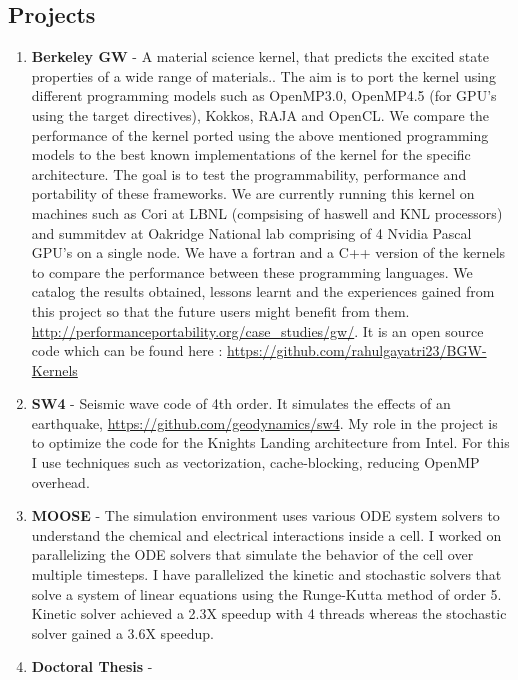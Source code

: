 \documentclass[margin]{res}
\begin{document}
\begin{resume}
\section{Projects}
\begin{enumerate}
%
        \item { \bf Berkeley GW} -
        A material science kernel, that predicts the excited state properties of a wide range of materials..
        The aim is to port the kernel using different programming models such as OpenMP3.0, OpenMP4.5 (for GPU's using the target directives), Kokkos, RAJA and OpenCL.
        We compare the performance of the kernel ported using the above mentioned programming models to the best known implementations of the kernel for the specific architecture.
        The goal is to test the programmability, performance and portability of these frameworks.
        We are currently running this kernel on machines such as Cori at LBNL (compsising of haswell and KNL processors) and summitdev at Oakridge National lab comprising of
        4 Nvidia Pascal GPU's on a single node.
        We have a fortran and a C++ version of the kernels to compare the performance between these programming languages.
        We catalog the results obtained, lessons learnt and the experiences gained from this project so that the future users might benefit from them.
        \url{http://performanceportability.org/case_studies/gw/}. It is an open source code which can be found here :
        \url{https://github.com/rahulgayatri23/BGW-Kernels}
%
    \item {\bf SW4} -
            Seismic wave code of 4th order.
            It simulates the effects of an earthquake, \url{https://github.com/geodynamics/sw4}.
            My role in the project is to optimize the code for the Knights Landing architecture from Intel.
            For this I use techniques such as vectorization, cache-blocking, reducing OpenMP overhead.
%
	   \item {\bf MOOSE } -
             The simulation environment uses various ODE system solvers to understand the chemical and electrical interactions inside a cell.
			 I worked on parallelizing the ODE solvers that simulate the behavior of the cell over multiple timesteps.
			 I have parallelized the kinetic and stochastic solvers that solve a system of linear equations using the Runge-Kutta method of order 5.
			 Kinetic solver achieved a 2.3X speedup with 4 threads whereas the stochastic solver gained a 3.6X speedup.
%
	   \item {\bf Doctoral Thesis} -

\end{enumerate}
\end{resume}
\end{document}
